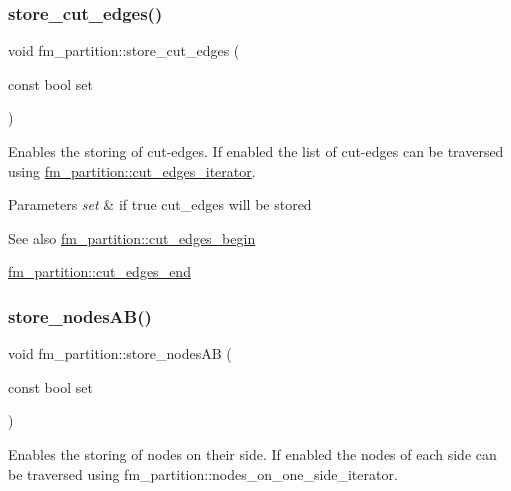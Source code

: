 \subsubsection{\texorpdfstring{store\+\_\+cut\+\_\+edges()}{store\_cut\_edges()}}
{\footnotesize\ttfamily void fm\+\_\+partition\+::store\+\_\+cut\+\_\+edges (\begin{DoxyParamCaption}\item[{const bool}]{set }\end{DoxyParamCaption})}

Enables the storing of cut-\/edges. If enabled the list of cut-\/edges can be traversed using \mbox{\hyperlink{classfm__partition_aede10aea3dda6be8014ce60fca728efe}{fm\+\_\+partition\+::cut\+\_\+edges\+\_\+iterator}}.


\begin{DoxyParams}{Parameters}
{\em set} & if {\ttfamily true} cut\+\_\+edges will be stored \\
\hline
\end{DoxyParams}
\begin{DoxySeeAlso}{See also}
\mbox{\hyperlink{classfm__partition_a36990b62c6d2d9e4948f42d805afc626}{fm\+\_\+partition\+::cut\+\_\+edges\+\_\+begin}} 

\mbox{\hyperlink{classfm__partition_af213672f08e03878183659fa8c2ed61e}{fm\+\_\+partition\+::cut\+\_\+edges\+\_\+end}} 
\end{DoxySeeAlso}
\mbox{\label{classfm__partition_a8926005b4637055d2acf6f29ad2d9b97}} 
\subsubsection{\texorpdfstring{store\+\_\+nodes\+A\+B()}{store\_nodesAB()}}
{\footnotesize\ttfamily void fm\+\_\+partition\+::store\+\_\+nodes\+AB (\begin{DoxyParamCaption}\item[{const bool}]{set }\end{DoxyParamCaption})}

Enables the storing of nodes on their side. If enabled the nodes of each side can be traversed using fm\+\_\+partition\+::nodes\+\_\+on\+\_\+one\+\_\+side\+\_\+iterator.


